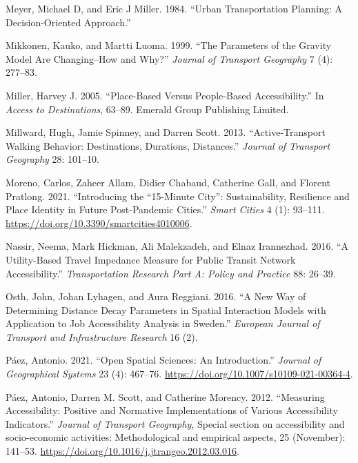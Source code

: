 \documentclass[preprint, 3p,
authoryear]{elsarticle} %
\newlength{\cslhangindent}
\newlength{\cslentryspacingunit} %
\newenvironment{CSLReferences}[2] %
 {%
  \setlength{\parindent}{0pt}
  \ifodd #1
  \let\oldpar\par
  \def\par{\hangindent=\cslhangindent\oldpar}
  \fi
  \setlength{\parskip}{#2\cslentryspacingunit}
 }%
 {}
\begin{document}
\begin{CSLReferences}{1}{0}
\leavevmode{}%
Meyer, Michael D, and Eric J Miller. 1984. {``Urban Transportation
Planning: A Decision-Oriented Approach.''}

\leavevmode{}%
Mikkonen, Kauko, and Martti Luoma. 1999. {``The Parameters of the
Gravity Model Are Changing--How and Why?''} \emph{Journal of Transport
Geography} 7 (4): 277--83.

\leavevmode{}%
Miller, Harvey J. 2005. {``Place-Based Versus People-Based
Accessibility.''} In \emph{Access to Destinations}, 63--89. Emerald
Group Publishing Limited.

\leavevmode{}%
Millward, Hugh, Jamie Spinney, and Darren Scott. 2013.
{``Active-Transport Walking Behavior: Destinations, Durations,
Distances.''} \emph{Journal of Transport Geography} 28: 101--10.

\leavevmode{}%
Moreno, Carlos, Zaheer Allam, Didier Chabaud, Catherine Gall, and
Florent Pratlong. 2021. {``Introducing the {``}15-Minute City{''}:
Sustainability, Resilience and Place Identity in Future Post-Pandemic
Cities.''} \emph{Smart Cities} 4 (1): 93--111.
\url{https://doi.org/10.3390/smartcities4010006}.

\leavevmode{}%
Nassir, Neema, Mark Hickman, Ali Malekzadeh, and Elnaz Irannezhad. 2016.
{``A Utility-Based Travel Impedance Measure for Public Transit Network
Accessibility.''} \emph{Transportation Research Part A: Policy and
Practice} 88: 26--39.

\leavevmode{}%
Osth, John, Johan Lyhagen, and Aura Reggiani. 2016. {``A New Way of
Determining Distance Decay Parameters in Spatial Interaction Models with
Application to Job Accessibility Analysis in Sweden.''} \emph{European
Journal of Transport and Infrastructure Research} 16 (2).

\leavevmode{}%
Páez, Antonio. 2021. {``Open Spatial Sciences: An Introduction.''}
\emph{Journal of Geographical Systems} 23 (4): 467--76.
\url{https://doi.org/10.1007/s10109-021-00364-4}.

\leavevmode{}%
Páez, Antonio, Darren M. Scott, and Catherine Morency. 2012.
{``Measuring Accessibility: Positive and Normative Implementations of
Various Accessibility Indicators.''} \emph{Journal of Transport
Geography}, Special section on accessibility and socio-economic
activities: Methodological and empirical aspects, 25 (November):
141--53. \url{https://doi.org/10.1016/j.jtrangeo.2012.03.016}.


\end{CSLReferences}
\end{document}
